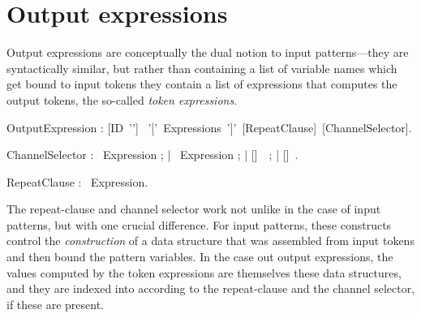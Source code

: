 


\section{Output expressions}\label{sect:OutputExpressions}


Output expressions
are conceptually the dual notion to input patterns---they are
syntactically similar, but rather than containing a list of variable
names which get bound to input tokens they contain a list of
expressions that computes the output tokens, the so-called {\em token
  expressions}.



\bgr
OutputExpression : [ID~'\charColon'] ~'['~Expressions~']'~[RepeatClause]~[ChannelSelector].

ChannelSelector : \kwAt~Expression ;
     | \kwAtN~Expression ; 
     | [\kwAtN]~\kwAny~;
     | [\kwAtN]~\kwAll.

RepeatClause : \kwRepeat~Expression.
\egr


The repeat-clause and channel selector work not unlike in the case of
input patterns, but with one crucial difference. For input patterns,
these constructs control the {\em construction} of a data structure
that was assembled from input tokens and then bound the pattern
variables. In the case out output expressions, the values computed by
the token expressions are themselves these data structures, and they are
indexed into according to the repeat-clause and the channel selector,
if these are present.

\begin{table}[t]
\caption{Token expression types depending on output expression kind
  and presence of a repeat-clause. ({\tt T} is the token type of the
  corresponding output port.)}\label{fig:OutputExprTypes}

\end{table}


